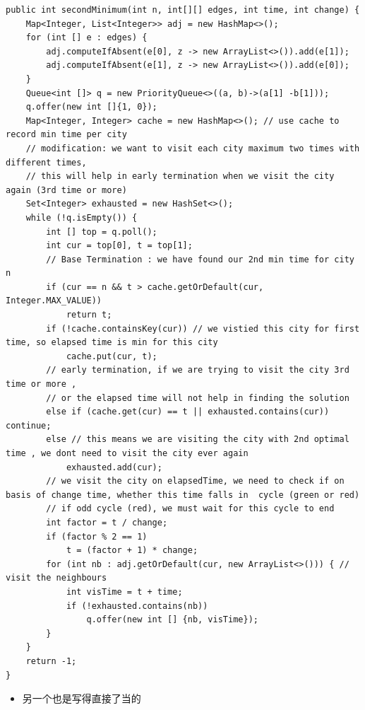 \documentclass[9pt, b5paaper]{book}
\begin{document}
\begin{verbatim}
public int secondMinimum(int n, int[][] edges, int time, int change) {
    Map<Integer, List<Integer>> adj = new HashMap<>();
    for (int [] e : edges) {
        adj.computeIfAbsent(e[0], z -> new ArrayList<>()).add(e[1]);
        adj.computeIfAbsent(e[1], z -> new ArrayList<>()).add(e[0]);
    }
    Queue<int []> q = new PriorityQueue<>((a, b)->(a[1] -b[1]));
    q.offer(new int []{1, 0});
    Map<Integer, Integer> cache = new HashMap<>(); // use cache to record min time per city
    // modification: we want to visit each city maximum two times with different times,
    // this will help in early termination when we visit the city again (3rd time or more)
    Set<Integer> exhausted = new HashSet<>();
    while (!q.isEmpty()) {
        int [] top = q.poll();
        int cur = top[0], t = top[1];
        // Base Termination : we have found our 2nd min time for city n
        if (cur == n && t > cache.getOrDefault(cur, Integer.MAX_VALUE))
            return t;
        if (!cache.containsKey(cur)) // we vistied this city for first time, so elapsed time is min for this city
            cache.put(cur, t);
        // early termination, if we are trying to visit the city 3rd time or more ,
        // or the elapsed time will not help in finding the solution
        else if (cache.get(cur) == t || exhausted.contains(cur)) continue;
        else // this means we are visiting the city with 2nd optimal time , we dont need to visit the city ever again
            exhausted.add(cur);
        // we visit the city on elapsedTime, we need to check if on basis of change time, whether this time falls in  cycle (green or red)
        // if odd cycle (red), we must wait for this cycle to end
        int factor = t / change;
        if (factor % 2 == 1)
            t = (factor + 1) * change;
        for (int nb : adj.getOrDefault(cur, new ArrayList<>())) { // visit the neighbours
            int visTime = t + time;
            if (!exhausted.contains(nb))
                q.offer(new int [] {nb, visTime});
        }
    }
    return -1;
}
\end{verbatim}
\begin{itemize}
\item 另一个也是写得直接了当的
\end{itemize}
\end{document}
